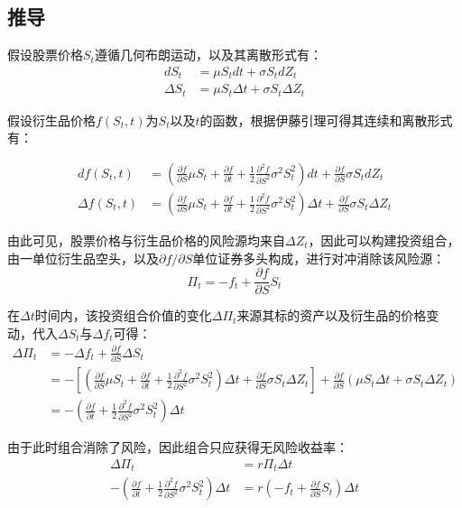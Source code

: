 \documentclass[11pt]{article}
\begin{document}
\subsection{推导}

假设股票价格$S_t$遵循几何布朗运动，以及其离散形式有：
\begin{align*}
    d S_t & = \mu S_t dt + \sigma S_t d Z_t \\
    \Delta S_t & = \mu S_t \Delta t + \sigma S_t \Delta Z_t
\end{align*}

假设衍生品价格$f(S_t, t)$为$S_t$以及$t$的函数，根据伊藤引理可得其连续和离散形式有：

\begin{align*}
    df(S_t,t) & = \left(\frac{\partial f}{\partial S} \mu S_t  + \frac{\partial f}{\partial t} + \frac{1}{2}\frac{\partial^2 f}{\partial S^2} \sigma^2 S_t^2 \right)dt + \frac{\partial f}{\partial S} \sigma S_t dZ_t \\
    \Delta f(S_t,t) & = \left(\frac{\partial f}{\partial S} \mu S_t  + \frac{\partial f}{\partial t} + \frac{1}{2}\frac{\partial^2 f}{\partial S^2} \sigma^2 S_t^2 \right) \Delta t + \frac{\partial f}{\partial S} \sigma S_t \Delta Z_t
\end{align*}

由此可见，股票价格与衍生品价格的风险源均来自$\Delta Z_t$，因此可以构建投资组合，由一单位衍生品空头，以及$\partial f/\partial S$单位证券多头构成，进行对冲消除该风险源：
\begin{equation*}
    \Pi_t = -f_t + \frac{\partial f}{\partial S} S_t
\end{equation*}

在$\Delta t$时间内，该投资组合价值的变化$\Delta \Pi_t$来源其标的资产以及衍生品的价格变动，代入$\Delta S_t$与$\Delta f_t$可得：
\begin{align*}
    \Delta \Pi_t & = -\Delta f_t + \frac{\partial f}{\partial S} \Delta S_t \\
    & = -\left[ \left(\frac{\partial f}{\partial S} \mu S_t  + \frac{\partial f}{\partial t} + \frac{1}{2}\frac{\partial^2 f}{\partial S^2} \sigma^2 S_t^2 \right) \Delta t + \frac{\partial f}{\partial S} \sigma S_t \Delta Z_t \right] + \frac{\partial f}{\partial S} \left( \mu S_t \Delta t + \sigma S_t \Delta Z_t \right) \\
    & = -\left( \frac{\partial f}{\partial t} + \frac{1}{2}\frac{\partial^2 f}{\partial S^2} \sigma^2 S_t^2 \right) \Delta t
\end{align*}

由于此时组合消除了风险，因此组合只应获得无风险收益率：
\begin{align*}
    \Delta \Pi_t & = r \Pi_t \Delta t \\
    -\left( \frac{\partial f}{\partial t} + \frac{1}{2}\frac{\partial^2 f}{\partial S^2} \sigma^2 S_t^2 \right) \Delta t & =  r \left( -f_t + \frac{\partial f}{\partial S} S_t \right) \Delta t
\end{align*}
\end{document}
